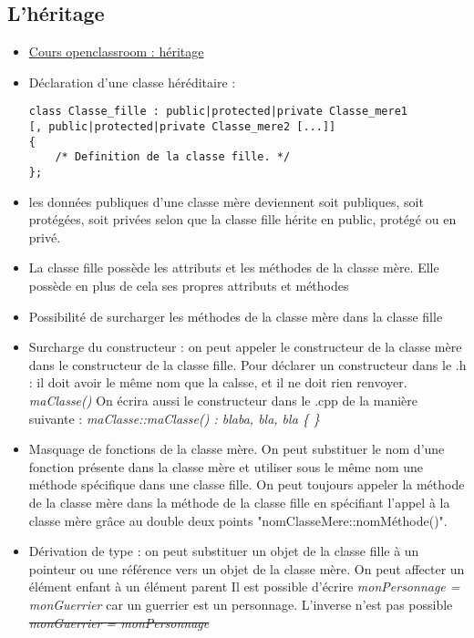 \documentclass[12pt,a4paper]{article}
\begin{document}
\subsection{L'héritage}
\begin{itemize}
\item \href{https://openclassrooms.com/fr/courses/1894236-programmez-avec-le-langage-c/1898475-lheritage}{Cours openclassroom : héritage}
\item Déclaration d'une classe héréditaire : 
\begin{lstlisting}
class Classe_fille : public|protected|private Classe_mere1
[, public|protected|private Classe_mere2 [...]]
{
    /* Definition de la classe fille. */
};
\end{lstlisting}
\item les données publiques d'une classe mère deviennent soit publiques, soit protégées, soit privées selon que la classe fille hérite en public, protégé ou en privé.
\item La classe fille possède les attributs et les méthodes de la classe mère. Elle possède en plus de cela ses propres attributs et méthodes
\item Possibilité de surcharger les méthodes de la classe mère dans la classe fille
\item Surcharge du constructeur : on peut appeler le constructeur de la classe mère dans le constructeur de la classe fille.
\newline Pour déclarer un constructeur dans le .h : il doit avoir le même nom que la calsse, et il ne doit rien renvoyer. \textit{maClasse()}
\newline On écrira aussi le constructeur dans le .cpp de la manière suivante : 
\newline \textit{maClasse::maClasse() : blaba, bla, bla \{ \}}
\item Masquage de fonctions de la classe mère. On peut substituer le nom d'une fonction présente dans la classe mère et utiliser sous le même nom une méthode spécifique dans une classe fille. On peut toujours appeler la méthode de la classe mère dans la méthode de la classe fille en spécifiant l'appel à la classe mère grâce au double deux points "nomClasseMere::nomMéthode()".
\item Dérivation de type : on peut substituer un objet de la classe fille à un pointeur ou une référence vers un objet de la classe mère. On peut affecter un élément enfant à un élément parent
\newline Il est possible d'écrire \textit{monPersonnage = monGuerrier} car un guerrier est un personnage. L'inverse n'est pas possible \sout{\textit{monGuerrier = monPersonnage}}

\end{itemize}
\end{document}
